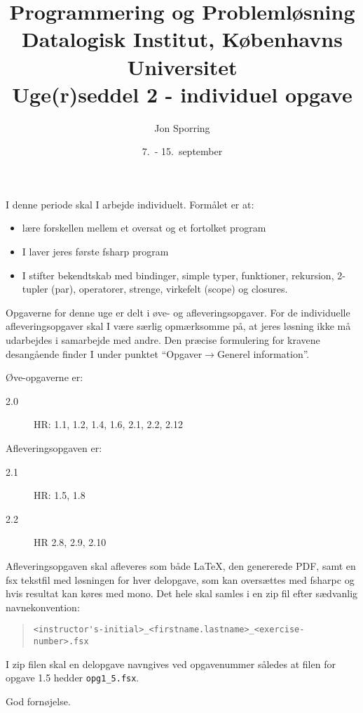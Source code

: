 \documentclass[a4paper,12pt]{article}
\title{Programmering og Problemløsning\\Datalogisk Institut,
  Københavns Universitet\\Uge(r)seddel 2 - individuel opgave}
\author{Jon Sporring}
\date{7.\ - 15.\ september}
\begin{document}
\maketitle

I denne periode skal I arbejde individuelt. Formålet er at:
\begin{itemize}
\item lære forskellen mellem et oversat og et fortolket program
\item I laver jeres første fsharp program
\item I stifter bekendtskab med bindinger, simple typer, funktioner,
  rekursion, 2-tupler (par), operatorer, strenge, virkefelt (scope) og closures.
\end{itemize}

Opgaverne for denne uge er delt i øve- og afleveringsopgaver. For de individuelle afleveringsopgaver skal I være særlig opmærksomme på, at jeres løsning ikke må udarbejdes i samarbejde med andre. Den præcise formulering for kravene desangående finder I under punktet "`Opgaver$\rightarrow$Generel information"'.

Øve-opgaverne er:
\begin{description}
\item[2.0] HR: 1.1, 1.2, 1.4, 1.6, 2.1, 2.2, 2.12
\end{description}

Afleveringsopgaven er:
\begin{description}
\item[2.1] HR: 1.5, 1.8
\item[2.2] HR 2.8, 2.9, 2.10
\end{description}
Afleveringsopgaven skal afleveres som både LaTeX, den genererede PDF, samt en fsx tekstfil med løsningen for hver delopgave, som kan oversættes med fsharpc og hvis resultat kan køres med mono. Det hele skal samles i en zip fil efter sædvanlig navnekonvention:
\begin{quote}
  \lstinline|<instructor's-initial>_<firstname.lastname>_<exercise-number>.fsx|
\end{quote}
I zip filen skal en delopgave navngives ved opgavenummer således at filen for opgave 1.5 hedder \lstinline|opg1_5.fsx|.

\flushright God fornøjelse.
\end{document}
